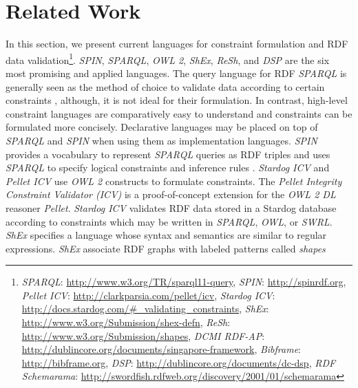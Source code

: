 \documentclass[a4paper,fontsize=11pt]{scrartcl}
\begin{document}

\section{Related Work}

In this section, we present current languages for constraint formulation and RDF data validation\footnote{
\emph{SPARQL}: \url{http://www.w3.org/TR/sparql11-query}, 
\emph{SPIN}: \url{http://spinrdf.org},
\emph{Pellet ICV}: \url{http://clarkparsia.com/pellet/icv},
\emph{Stardog ICV}: \url{http://docs.stardog.com/#_validating_constraints},
\emph{ShEx}: \url{http://www.w3.org/Submission/shex-defn},
\emph{ReSh}: \url{http://www.w3.org/Submission/shapes},
\emph{DCMI RDF-AP}: \url{http://dublincore.org/documents/singapore-framework},
\emph{Bibframe}: \url{http://bibframe.org},
\emph{DSP}: \url{http://dublincore.org/documents/dc-dsp},
\emph{RDF Schemarama}: \url{http://swordfish.rdfweb.org/discovery/2001/01/schemarama}
}.
\emph{SPIN}, \emph{SPARQL}, \emph{OWL 2}, \emph{ShEx}, \emph{ReSh}, and \emph{DSP} are the six most promising and applied languages.
%
The query language for RDF \emph{SPARQL} is generally seen as the method of choice to validate data according to certain constraints \cite{Fuerber2010}, 
although, it is not ideal for their formulation. 
In contrast, high-level constraint languages are comparatively easy to understand and constraints can be formulated more concisely.
Declarative languages may be placed on top of \emph{SPARQL} and \emph{SPIN} when using them as implementation languages.
%
\emph{SPIN} provides a vocabulary to represent \emph{SPARQL} queries as RDF triples
and uses \emph{SPARQL} to specify logical constraints and inference rules \cite{Fuerber2010}.
%
\emph{Stardog ICV} and \emph{Pellet ICV} use \emph{OWL 2} constructs to formulate constraints.
The \emph{Pellet Integrity Constraint Validator (ICV)} is a proof-of-concept extension for the \emph{OWL 2 DL} reasoner \emph{Pellet}. 
\emph{Stardog ICV} 
validates RDF data stored in a Stardog database according to 
constraints which may be written in \emph{SPARQL}, \emph{OWL}, or \emph{SWRL}. 
%
\emph{ShEx} specifies a language whose syntax and semantics are similar to regular expressions.
\emph{ShEx} associate RDF graphs with labeled patterns called \emph{shapes} 
\end{document}
